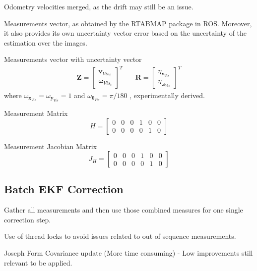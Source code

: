 Odometry velocities merged, as the drift may still be an issue.

Measurements vector, as obtained by the \gls{RTABMAP} package in \gls{ROS}.
Moreover, it also provides its own uncertainty vector error based on the uncertainty of the estimation over the images.

Measurements vector with uncertainty vector
\begin{align}
\mathbf{Z}
=
\begin{bmatrix}
\mathbf{v}_{Vis_t} \\
\boldsymbol \omega_{Vis_t}
\end{bmatrix}^T
& \quad
\mathbf{R}
=
\begin{bmatrix}
\eta_{\mathbf{v}_{Vis}} \\
\eta_{\boldsymbol \omega_{Vis}}
\end{bmatrix}^T
\end{align}
where $ \omega_{\mathbf{x}_{Vis}} = \omega_{\mathbf{y}_{Vis}} = 1$ and
$ \omega_{\boldsymbol \theta_{Vis}} = \pi/180 $ , experimentally derived.


Measurement Matrix
\begin{equation}
H
=
\begin{bmatrix}
0 & 0 & 0 & 1 & 0 & 0 \\
0 & 0 & 0 & 0 & 1 & 0
\end{bmatrix}
\end{equation}

Measurement Jacobian Matrix
\begin{equation}
J_H
=
\begin{bmatrix}
0 & 0 & 0 & 1 & 0 & 0 \\
0 & 0 & 0 & 0 & 1 & 0
\end{bmatrix}
\end{equation}



\subsection{Batch \gls{EKF} Correction}

\noindent
Gather all measurements and then use those combined measures for one single correction step.


Use of thread locks to avoid issues related to out of sequence measurements.

Joseph Form Covariance update
(More time consuming) - Low improvements still relevant to be applied.



